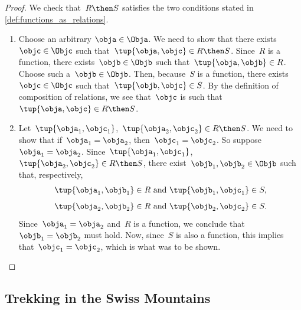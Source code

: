 \begin{proof}
We check that~$R \then S$ satisfies the two conditions stated in \cref{def:functions_as_relations}.

\begin{enumerate}
\item Choose an arbitrary $\obja \in \Obja$. We need to show that there exists~$\objc \in \Objc$ such that~$\tup{\obja,\objc} \in R \then S$.  Since~$R$ is a function, there exists~$\objb \in \Objb$ such that~$\tup{\obja,\objb} \in R$. Choose such a~$\objb \in \Objb$. Then, because~$S$ is a function, there exists~$\objc \in \Objc$ such that~$\tup{\objb,\objc} \in S$. By the definition of composition of relations, we see that~$\objc$ is such that~$\tup{\obja,\objc} \in R \then S$.
\item Let~$\tup{\obja_1, \objc_1}$,~$\tup{\obja_2,\objc_2} \in R \then S$. We need to show that if~$\obja_1 = \obja_2$, then~$\objc_1 = \objc_2$. So suppose~$\obja_1 = \obja_2$. Since~$\tup{\obja_1, \objc_1}$,~$\tup{\obja_2,\objc_2} \in R \then S$, there exist~$\objb_1, \objb_2 \in \Objb$ such that, respectively,
\begin{equation*}
\tup{\obja_1, \objb_1} \in R \text{ and } \tup{\objb_1, \objc_1} \in S,
\end{equation*}
\begin{equation*}
\tup{\obja_2, \objb_2} \in R \text{ and } \tup{\objb_2, \objc_2} \in S.
\end{equation*}
Since~$\obja_1 = \obja_2$ and~$R$ is a function, we conclude that~$\objb_1 = \objb_2$ must hold. Now, since~$S$ is also a function, this implies that~$\objc_1 = \objc_2$, which is what was to be shown.
\end{enumerate}
\end{proof}




\subsection{Trekking in the Swiss Mountains }
\label{sec:trekking}

